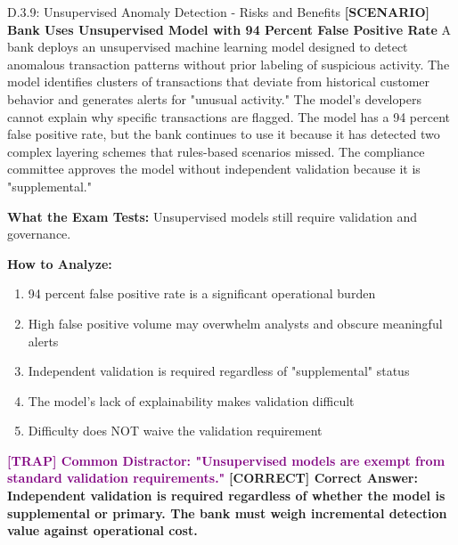 \documentclass[11pt,a4paper]{beamer}
\newcommand{\trap}[1]{\textcolor{purple}{\textbf{[TRAP] #1}}}
\newcommand{\correct}[1]{\textcolor{green!50!black}{\textbf{[CORRECT] #1}}}
\newcommand{\scenario}[1]{\textcolor{blue!70!black}{\textbf{[SCENARIO] #1}}}
\begin{document}
\begin{frame}{D.3.9: Unsupervised Anomaly Detection - Risks and Benefits}
	\scenario{Bank Uses Unsupervised Model with 94 Percent False Positive Rate}
	A bank deploys an unsupervised machine learning model designed to detect anomalous transaction patterns without prior labeling of suspicious activity. The model identifies clusters of transactions that deviate from historical customer behavior and generates alerts for "unusual activity." The model's developers cannot explain why specific transactions are flagged. The model has a 94 percent false positive rate, but the bank continues to use it because it has detected two complex layering schemes that rules-based scenarios missed. The compliance committee approves the model without independent validation because it is "supplemental."
	
	\vspace{0.1cm}
	\textbf{What the Exam Tests:} Unsupervised models still require validation and governance.
	
	\vspace{0.1cm}
	\textbf{How to Analyze:}
	\begin{enumerate}
		\item 94 percent false positive rate is a significant operational burden
		\item High false positive volume may overwhelm analysts and obscure meaningful alerts
		\item Independent validation is required regardless of "supplemental" status
		\item The model's lack of explainability makes validation difficult
		\item Difficulty does NOT waive the validation requirement
	\end{enumerate}
	
	\trap{Common Distractor: "Unsupervised models are exempt from standard validation requirements."}
	\correct{Correct Answer: Independent validation is required regardless of whether the model is supplemental or primary. The bank must weigh incremental detection value against operational cost.}
\end{frame}
\end{document}
